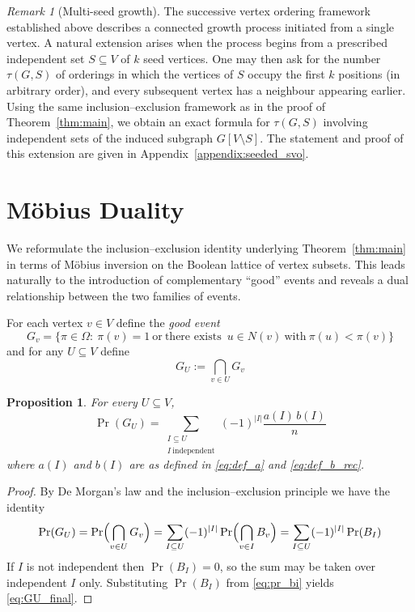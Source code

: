 \documentclass[11pt,a4paper]{article}
\numberwithin{equation}{section}
\theoremstyle{plain}
\newtheorem{proposition}[theorem]{Proposition}
\theoremstyle{definition}
\theoremstyle{remark}
\newtheorem{remark}[theorem]{Remark}
\begin{document}
\begin{remark}[Multi-seed growth]
The successive vertex ordering framework established above describes a connected growth process initiated from a single vertex. A natural extension arises when the process begins from a prescribed independent set \(S\subseteq V\) of \(k\) seed vertices. One may then ask for the number \(\tau(G,S)\) of orderings in which the vertices of \(S\) occupy the first \(k\) positions (in arbitrary order), and every subsequent vertex has a neighbour appearing earlier. Using the same inclusion--exclusion framework as in the proof of Theorem~\ref{thm:main}, we obtain an exact formula for \(\tau(G,S)\) involving independent sets of the induced subgraph \(G[V\setminus S]\). The statement and proof of this extension are given in Appendix~\ref{appendix:seeded_svo}.
\end{remark}

\section{Möbius Duality}
\label{sec:mobius}

We reformulate the inclusion--exclusion identity underlying Theorem~\ref{thm:main} in terms of Möbius inversion on the Boolean lattice of vertex subsets. This leads naturally to the introduction of complementary “good” events and reveals a dual relationship between the two families of events.

For each vertex \(v\in V\) define the \emph{good event}
\[ G_v = \bigl\{\pi\in\Omega:\ \pi(v)=1
\ \text{or}\ \text{there exists }\,u\in N(v)\ \text{with}\ \pi(u)<\pi(v)\bigr\}
\]
and for any \(U\subseteq V\) define
\[ G_U := \bigcap_{v\in U} G_v \]

\begin{proposition}\label{prop:general_U}
    For every \(U\subseteq V\),
    \begin{equation}\label{eq:GU_final}
    \Pr(G_U)  =
    \sum_{\substack{I\subseteq U\\ I\ \mathrm{independent}}}
    (-1)^{|I|}\frac{a(I)\,b(I)}{n}
    \end{equation}
    where \(a(I)\) and \(b(I)\) are as defined in \eqref{eq:def_a} and \eqref{eq:def_b_rec}.
    \end{proposition}

\begin{proof}
    By De Morgan's law and the inclusion--exclusion principle we have the identity
    \[
    \Pr(G_U)
    =\Pr\Bigl(\bigcap_{v\in U} G_v\Bigr)
    =\sum_{I\subseteq U}(-1)^{|I|}\Pr\Bigl(\bigcap_{v\in I} B_v\Bigr)
    = \sum_{I\subseteq U}(-1)^{|I|}\Pr(B_I)
    \]
    If \(I\) is not independent then \(\Pr(B_I)=0\), so the sum may be taken over independent \(I\) only.
    Substituting \(\Pr(B_I)\) from \eqref{eq:pr_bi} yields \eqref{eq:GU_final}.
\end{proof}
\end{document}
